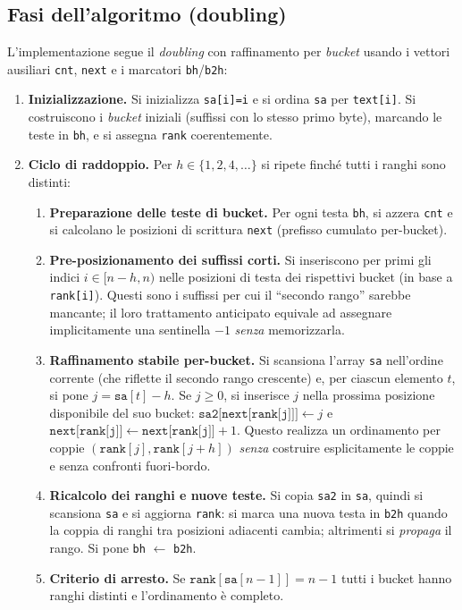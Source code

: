 		\subsection{Fasi dell'algoritmo (doubling)}
			L'implementazione segue il \emph{doubling} con raffinamento per \emph{bucket} usando i vettori ausiliari \texttt{cnt}, \texttt{next} e i marcatori \texttt{bh}/\texttt{b2h}:
			\begin{enumerate}
				\item \textbf{Inizializzazione.}
				Si inizializza \texttt{sa[i]=i} e si ordina \texttt{sa} per \texttt{text[i]}.
				Si costruiscono i \emph{bucket} iniziali (suffissi con lo stesso primo byte), marcando le teste in \texttt{bh}, e si assegna \texttt{rank} coerentemente.
				\item \textbf{Ciclo di raddoppio.} Per $h \in \{1,2,4,\dots\}$ si ripete finché tutti i ranghi sono distinti:
				\begin{enumerate}
					\item \textbf{Preparazione delle teste di bucket.}
					Per ogni testa \texttt{bh}, si azzera \texttt{cnt} e si calcolano le posizioni di scrittura \texttt{next} (prefisso cumulato per-bucket).
					\item \textbf{Pre-posizionamento dei suffissi corti.}
					Si inseriscono per primi gli indici $i \in [n-h, n)$ nelle posizioni di testa dei rispettivi bucket (in base a \texttt{rank[i]}).
					Questi sono i suffissi per cui il “secondo rango” sarebbe mancante; il loro trattamento anticipato equivale ad assegnare implicitamente una sentinella $-1$ \emph{senza} memorizzarla.
					\item \textbf{Raffinamento stabile per-bucket.}
					Si scansiona l'array \texttt{sa} nell'ordine corrente (che riflette il secondo rango crescente) e, per ciascun elemento $t$, si pone $j=\texttt{sa}[t]-h$.
					Se $j \ge 0$, si inserisce $j$ nella prossima posizione disponibile del suo bucket:
					$\texttt{sa2[next[rank[j]]]} \leftarrow j$ e $\texttt{next[rank[j]]} \leftarrow \texttt{next[rank[j]]} + 1$.
					Questo realizza un ordinamento per coppie $(\texttt{rank}[j], \texttt{rank}[j+h])$ \emph{senza} costruire esplicitamente le coppie e senza confronti fuori-bordo.
					\item \textbf{Ricalcolo dei ranghi e nuove teste.}
					Si copia \texttt{sa2} in \texttt{sa}, quindi si scansiona \texttt{sa} e si aggiorna \texttt{rank}:
					si marca una nuova testa in \texttt{b2h} quando la coppia di ranghi tra posizioni adiacenti cambia; altrimenti si \emph{propaga} il rango.
					Si pone \texttt{bh} \(\leftarrow\) \texttt{b2h}.
					\item \textbf{Criterio di arresto.}
					Se $\texttt{rank}[\texttt{sa}[n-1]] = n-1$ tutti i bucket hanno ranghi distinti e l'ordinamento è completo.
				\end{enumerate}
			\end{enumerate}
			
